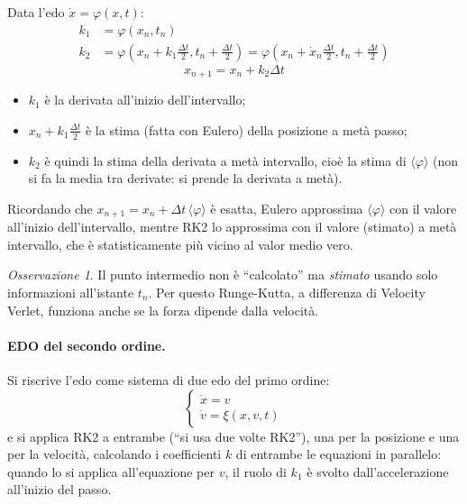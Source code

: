 \documentclass[11pt, a4paper, openright]{book}
\theoremstyle{plain}
\theoremstyle{definition}
\theoremstyle{remark}
\newtheorem{osservazione}[teorema]{Osservazione}
\begin{document}
Data l'edo $\dot{x} = \varphi(x, t)$:
\begin{align}
    k_1 &= \varphi(x_n, t_n) \\
    k_2 &= \varphi\left(x_n + k_1\frac{\Delta t}{2}, t_n + \frac{\Delta t}{2}\right) = \varphi\left(x_n + \dot{x}_n\frac{\Delta t}{2}, t_n + \frac{\Delta t}{2}\right)
\end{align}
\begin{equation}
    \boxed{x_{n + 1} = x_n + k_2\Delta t}
\end{equation}
\begin{itemize}
    \item $k_1$ è la derivata all'inizio dell'intervallo;
    \item $x_n + k_1\frac{\Delta t}{2}$ è la stima (fatta con Eulero) della posizione a metà passo;
    \item $k_2$ è quindi la stima della derivata a metà intervallo, cioè la stima di $\langle\varphi\rangle$ (non si fa la media tra derivate: si prende la derivata a metà).
\end{itemize}
Ricordando che $x_{n + 1} = x_n + \Delta t\,\langle\varphi\rangle$ è esatta, Eulero approssima $\langle\varphi\rangle$ con il valore all'inizio dell'intervallo, mentre RK2 lo approssima con il valore (stimato) a metà intervallo, che è statisticamente più vicino al valor medio vero.

\begin{osservazione}
    Il punto intermedio non è ``calcolato'' ma \emph{stimato} usando solo informazioni all'istante $t_n$. Per questo Runge-Kutta, a differenza di Velocity Verlet, funziona anche se la forza dipende dalla velocità.
\end{osservazione}

\paragraph{EDO del secondo ordine.} Si riscrive l'edo come sistema di due edo del primo ordine:
\begin{equation}
    \begin{cases}
        \dot{x} = v \\
        \dot{v} = \xi(x, v, t)
    \end{cases}
\end{equation}
e si applica RK2 a entrambe (``si usa due volte RK2''), una per la posizione e una per la velocità, calcolando i coefficienti $k$ di entrambe le equazioni in parallelo: quando lo si applica all'equazione per $v$, il ruolo di $k_1$ è svolto dall'accelerazione all'inizio del passo.
\end{document}
